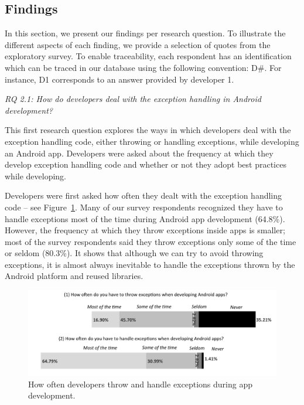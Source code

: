 \subsection{Findings}

In this section, we present our findings per research question.
To illustrate the different aspects of each
finding, we provide a selection of quotes from the exploratory
survey.
To enable traceability, each respondent has an identification
 which can be traced in our database using the following convention:
D\#. For instance, D1 corresponds to an answer provided
 by developer 1.

\bigskip
\noindent\emph{RQ 2.1: How do developers deal with the exception handling in Android development?}
\bigskip

This first research question explores the ways in which developers deal with the exception handling code, either throwing or handling exceptions,  while developing an Android app.  Developers were asked about the frequency at which they develop exception handling code and whether or not they adopt best practices while developing.


Developers were first asked how often they dealt with the exception handling code -- see Figure~\ref{fig:often}. Many of our survey respondents recognized they have to handle exceptions most of the time during Android app development (64.8\%). However, the frequency at which they throw exceptions inside apps is smaller; most of the survey respondents said they throw exceptions only some of the time or seldom (80.3\%). It shows that although we can try to avoid throwing exceptions, it is almost always inevitable to handle the exceptions thrown by the Android platform and reused libraries.

\begin{figure} \centering \includegraphics[scale=0.58]{agree_new4_point.png}
\caption{How often developers throw and handle exceptions during app development.}
\label{fig:often}
\end{figure}

